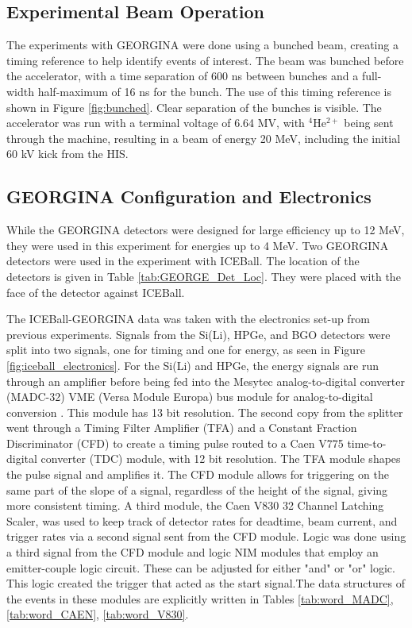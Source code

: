 \subsection{Experimental Beam Operation}

The experiments with GEORGINA were done using a bunched beam, creating a timing reference to help identify events of interest. The beam was bunched before the accelerator, with a time separation of 600 ns between bunches and a full-width half-maximum of 16 ns for the bunch. The use of this timing reference is shown in Figure \ref{fig:bunched}. Clear separation of the bunches is visible. The accelerator was run with a terminal voltage of 6.64 MV, with $^{4}$He$^{2+}$ being sent through the machine, resulting in a beam of energy 20 MeV, including the initial 60 kV kick from the HIS. 



\subsection{GEORGINA Configuration and Electronics}
\label{sec:GEORGINA_electronics}

While the GEORGINA detectors were designed for large efficiency up to 12 MeV, they were used in this experiment for energies up to 4 MeV. Two GEORGINA detectors were used in the experiment with ICEBall. The location of the detectors is given in Table \ref{tab:GEORGE_Det_Loc}. They were placed with the face of the detector against ICEBall.



The ICEBall-GEORGINA data was taken with the electronics set-up from previous experiments\citep{battaglia15:_iceball_176lu}. Signals from the Si(Li), HPGe, and BGO detectors were split into two signals, one for timing and one for energy, as seen in Figure \ref{fig:iceball_electronics}. For the Si(Li) and HPGe, the energy signals are run through an amplifier before being fed into the Mesytec analog-to-digital converter (MADC-32) VME (Versa Module Europa) bus module for analog-to-digital conversion \citep{mesytec:_ADC}. This module has 13 bit resolution. The second copy from the splitter went through a Timing Filter Amplifier (TFA) and a Constant Fraction Discriminator (CFD) to create a timing pulse routed to a Caen V775 time-to-digital converter (TDC) module, with 12 bit resolution\citep{caen:_TDC}. The TFA module shapes the pulse signal and amplifies it. The CFD module allows for triggering on the same part of the slope of a signal, regardless of the height of the signal, giving more consistent timing. A third module, the Caen V830 32 Channel Latching Scaler, was used to keep track of detector rates for deadtime, beam current, and trigger rates\citep{caen:_scaler} via a second signal sent from the CFD module. Logic was done using a third signal from the CFD module and logic NIM modules that employ an emitter-couple logic circuit. These can be adjusted for either "and" or "or" logic. This logic created the trigger that acted as the start signal.The data structures of the events in these modules are explicitly written in Tables \ref{tab:word_MADC}, \ref{tab:word_CAEN}, \ref{tab:word_V830}.

